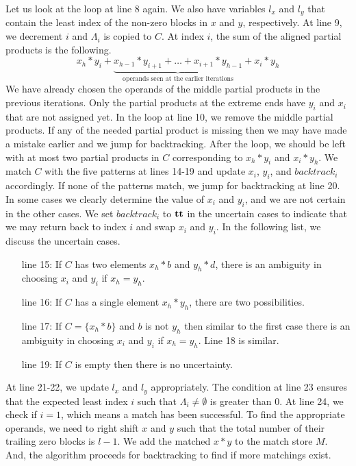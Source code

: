 Let us look at the loop at line 8 again.
%
We also have variables $l_x$ and $l_y$ that contain the least index of
the non-zero blocks in $x$ and $y$, respectively.
%
At line 9, we decrement $i$ and $\Lambda_i$ is copied to $C$.
%
At index $i$, the sum of the aligned partial products is the following.
$$
x_{h}*y_{i} + \underbrace{x_{h-1}*y_{i+1} + \dots + x_{i+1}*y_{h-1}}_{\text{operands seen at the earlier iterations}} + x_{i}*y_{h}
$$
We have already chosen the operands of the middle partial products in
the previous iterations.
%
Only the partial products at the extreme ends have $y_i$ and $x_i$ that are
not assigned yet.
%
In the loop at line 10, we remove the middle partial products.
%
If any of the needed partial product is missing then we may have made a mistake
earlier and we jump for backtracking.
%
After the loop, we should be left with at most two partial products in $C$
corresponding to $x_{h}*y_{i}$ and $x_{i}*y_{h}$.
%
We match $C$ with the five patterns at lines 14-19 and
update $x_i$, $y_i$, and $backtrack_i$ accordingly.
%
If none of the patterns match, we jump for backtracking at line 20.
%
In some cases we clearly determine the value of $x_i$ and $y_i$, and
we are not certain in the other cases.
%
We set $backtrack_i$ to $\mathbf{tt}$ in the uncertain cases to indicate
that we may return back to index $i$ and swap $x_i$ and $y_i$.
%
In the following list, we discuss the uncertain cases.
%
\begin{itemize}
\item[line 15:] If $C$ has two elements $x_h*b$ and $y_h*d$,
there is an ambiguity in choosing $x_i$ and $y_i$
if $x_h = y_h$.
%
\item[line 16:] If $C$ has a single element $x_h*y_h$, there  
are two possibilities.
\item[line 17:] If $C = \{x_h*b\}$ and $b$ is not $y_h$ then 
  similar to the first case there is an ambiguity in
  choosing $x_i$ and $y_i$ if $x_h = y_h$. Line 18 is similar.
\item[line 19:] If $C$ is empty then there is no uncertainty. %
\end{itemize}
%
At line 21-22, we update $l_x$ and $l_y$ appropriately.
%
The condition at line 23 ensures that the expected
least index $i$ such that $\Lambda_i \neq \emptyset$ is greater than 0.    
%
At line 24, we check if $i=1$, which means a match has been successful.
%
To find the appropriate operands, we need to right shift $x$ and $y$
such that the total number of their trailing zero blocks is $l-1$.
%
We add the matched $x*y$ to the match store $M$.
%
And, the algorithm proceeds for backtracking to find if more matchings
exist.

